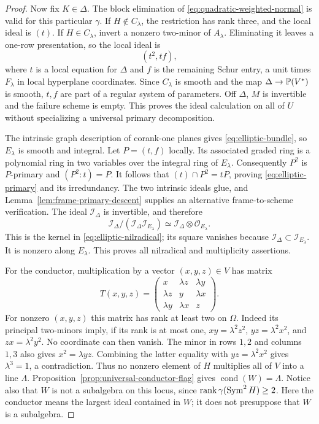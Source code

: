 \begin{proof}
Now fix $K\in\Delta$. The block elimination of
\eqref{eq:quadratic-weighted-normal} is valid for this particular
$\gamma$. If $H\notin C_\lambda$, the restriction has rank three,
and the local ideal is $(t)$. If $H\in C_\lambda$, invert a
nonzero two-minor of $A_\lambda$. Eliminating it leaves a one-row
presentation, so the local ideal is
\begin{equation}\label{eq:elliptic-local-ring}
 (t^2,tf),
\end{equation}
where $t$ is a local equation for $\Delta$ and $f$ is the remaining
Schur entry, a unit times $F_\lambda$ in local hyperplane
coordinates. Since $C_\lambda$ is smooth and the map
$\Delta\to\mathbb P(V^*)$ is smooth, $t,f$ are part of a regular
system of parameters. Off $\Delta$, $M$ is invertible and the
failure scheme is empty. This proves the ideal calculation on all
of $U$ without specializing a universal primary decomposition.

The intrinsic graph description of corank-one planes gives
\eqref{eq:elliptic-bundle}, so $E_\lambda$ is smooth and integral.
Let $P=(t,f)$ locally. Its associated graded ring is a polynomial
ring in two variables over the integral ring of $E_\lambda$.
Consequently $P^2$ is $P$-primary and $(P^2:t)=P$.
It follows that $(t)\cap P^2=tP$, proving
\eqref{eq:elliptic-primary} and its irredundancy. The two intrinsic
ideals glue, and Lemma~\ref{lem:frame-primary-descent} supplies
an alternative frame-to-scheme verification. The ideal
$\mathcal I_\Delta$ is invertible, and therefore
\[
 \mathcal I_\Delta/
          (\mathcal I_\Delta\mathcal I_{E_\lambda})
       \simeq\mathcal I_\Delta\otimes\mathcal O_{E_\lambda}.
\]
This is the kernel in \eqref{eq:elliptic-nilradical}; its square
vanishes because $\mathcal I_\Delta\subset\mathcal I_{E_\lambda}$.
It is nonzero along $E_\lambda$. This proves all nilradical and
multiplicity assertions.

For the conductor, multiplication by a vector $(x,y,z)\in V$ has
matrix
\[
 T(x,y,z)=
 \begin{pmatrix}
 x&\lambda z&\lambda y\\
 \lambda z&y&\lambda x\\
 \lambda y&\lambda x&z
 \end{pmatrix}.
\]
For nonzero $(x,y,z)$ this matrix has rank at least two on $\Omega$.
Indeed its principal two-minors imply, if its rank is at most one,
$xy=\lambda^2z^2$, $yz=\lambda^2x^2$, and $zx=\lambda^2y^2$.
No coordinate can then vanish. The minor in rows $1,2$ and columns
$1,3$ also gives $x^2=\lambda yz$. Combining the latter equality
with $yz=\lambda^2x^2$ gives $\lambda^3=1$, a contradiction.
Thus no nonzero element of $H$ multiplies all of $V$ into a line
$\Lambda$. Proposition~\ref{prop:universal-conductor-flag} gives
$\operatorname{cond}(W)=\Lambda$. Notice also that $W$ is not a
subalgebra on this locus, since $\operatorname{rank}\gamma(\operatorname{Sym}^2H)\ge2$.
Here the conductor means the largest ideal contained in $W$;
it does not presuppose that $W$ is a subalgebra.


\end{proof}
